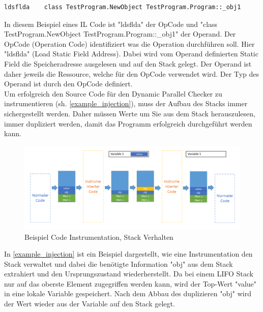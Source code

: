 \documentclass[10pt,a4paper]{article}
\begin{document}
\begin{lstlisting}
ldsflda    class TestProgram.NewObject TestProgram.Program::_obj1
\end{lstlisting}
In diesem Beispiel eines IL Code ist "ldsflda" der OpCode und "class TestProgram.NewObject TestProgram.Program::\_obj1" der Operand. Der OpCode (Operation Code) identifiziert was die Operation durchführen soll. Hier "ldsflda" (Load Static Field Address). Dabei wird vom Operand definierten Static Field die Speicheradresse ausgelesen und auf den Stack gelegt. Der Operand ist daher jeweils die Ressource, welche für den OpCode verwendet wird. Der Typ des Operand ist durch den OpCode definiert.\\
Um erfolgreich den Source Code für den Dynamic Parallel Checker zu instrumentieren (sh. \autoref{example_injection}), muss der Aufbau des Stacks immer sichergestellt werden. Daher müssen Werte um Sie aus dem Stack herauszulesen, immer dupliziert werden, damit das Programm erfolgreich durchgeführt werden kann.\\
\begin{figure}[H]
\centering
\includegraphics[scale=0.5]{images/BeispielInjection.png}
\caption{Beispiel Code Instrumentation, Stack Verhalten}
\label{example_injection}
\end{figure}
In \autoref{example_injection} ist ein Beispiel dargestellt, wie eine Instrumentation den Stack verwaltet und dabei die benötigte Information "obj" aus dem Stack extrahiert und den Ursprungszustand wiederherstellt. Da bei einem LIFO Stack nur auf das oberste Element zugegriffen werden kann, wird der Top-Wert "value" in eine lokale Variable gespeichert. Nach dem Abbau des duplizieren "obj" wird der Wert wieder aus der Variable auf den Stack gelegt.
\end{document}

